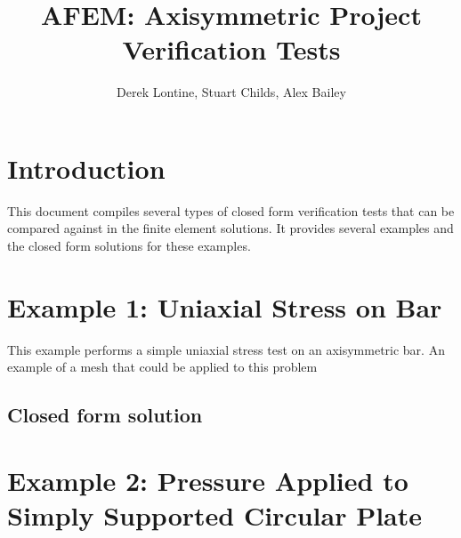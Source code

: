 \documentclass[10pt,letterpaper]{report}
\author{Derek Lontine, Stuart Childs, Alex Bailey}
\title{AFEM: Axisymmetric Project Verification Tests}
\numberwithin{equation}{chapter}
\begin{document}
\maketitle

\chapter{Introduction}
This document compiles several types of closed form verification tests that can be compared against in the finite element solutions. It provides several examples and the closed form solutions for these examples. 

\chapter{Example 1: Uniaxial Stress on Bar}
This example performs a simple uniaxial stress test on an axisymmetric bar. An example of a mesh that could be applied to this problem 

\section{Closed form solution}

\chapter{Example 2: Pressure Applied to Simply Supported Circular Plate}

\end{document}
